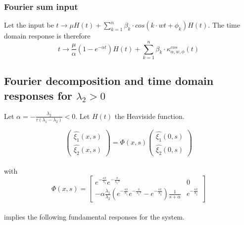 \documentclass[preprint]{elsarticle}
\begin{document}
\subsubsection{Fourier sum input}

Let the input be $t\rightarrow\mu H\left(t\right)+\sum_{k=1}^{n}\beta_{k}\cdot cos\left(k\cdot wt+\phi_{k}\right)H\left(t\right)$.
The time domain response is therefore 
\[
t\rightarrow\frac{\mu}{\alpha}\left(1-e^{-\alpha t}\right)H\left(t\right)+\sum_{k=1}^{n}\beta_{k}\cdot\kappa_{\alpha,w,\phi}^{cos}\left(t\right)
\]



\subsection{Fourier decomposition and time domain responses for $\lambda_{2}>0$}

Let $\alpha=-\frac{\lambda_{2}}{\tau\left(\lambda_{1}-\lambda_{2}\right)}<0$.
Let $H\left(t\right)$ the Heaviside function.

\[
\left(\begin{array}{c}
\widehat{\xi_{1}}\left(x,s\right)\\
\widehat{\xi_{2}}\left(x,s\right)
\end{array}\right)=\Phi\left(x,s\right)\left(\begin{array}{c}
\widehat{\xi_{1}}\left(0,s\right)\\
\widehat{\xi_{2}}\left(0,s\right)
\end{array}\right)
\]
\\
with 
\[
\Phi\left(x,s\right)=\left[\begin{array}{cc}
e^{-\frac{sx}{\lambda_{1}}}e^{-\frac{x}{\lambda_{1}\tau}} & 0\\
-\alpha\frac{\lambda_{1}}{\lambda_{2}}\left(e^{-\frac{sx}{\lambda_{1}}}e^{-\frac{x}{\lambda_{1}\tau}}-e^{-\frac{sx}{\lambda_{2}}}\right)\frac{1}{s+\alpha} & e^{-\frac{sx}{\lambda_{2}}}
\end{array}\right]
\]
\\
implies the following fundamental responses for the system.
\end{document}
